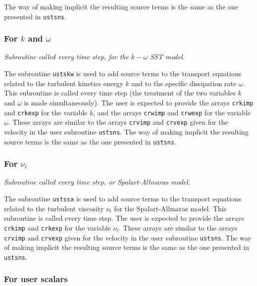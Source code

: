 {{{The way of making implicit the resulting source terms is the same as the
one presented in \texttt{ustsns}.

\subsubsection{For $k$ and $\omega$}

\noindent
\textit{Subroutine called every time step, for the $k-\omega$ SST model.}

The subroutine \texttt{ustskw} is used to add source terms to the transport equations
related to the turbulent kinetics energy $k$ and to the specific
dissipation rate $\omega$. This subroutine is
called every time step (the treatment of the two
variables $k$ and $\omega$ is made simultaneously). The user is expected
to provide the arrays \texttt{crkimp} and \texttt{crkexp} for the variable
$k$, and the arrays \texttt{crwimp} and \texttt{crwexp} for the variable $\omega$.
These arrays are similar to the arrays \texttt{crvimp} and \texttt{crvexp}
given for the velocity in the user subroutine \texttt{ustsns}. The way of
making implicit the resulting source terms is the same as the one presented in
\texttt{ustsns}.

\subsubsection{For $\nu_t$}

\noindent
\textit{Subroutine called every time step, or Spalart-Allmaras model.}

The subroutine \texttt{ustssa} is used to add source terms to the transport equations
related to the turbulent viscosity $\nu_t$ for the Spalart-Allmaras model.
This subroutine is called every time step. The user is expected
to provide the arrays \texttt{crkimp} and \texttt{crkexp} for the variable
$\nu_t$. These arrays are similar to the arrays \texttt{crvimp} and \texttt{crvexp}
given for the velocity in the user subroutine \texttt{ustsns}. The way of
making implicit the resulting source terms is the same as the one presented in
\texttt{ustsns}.

\subsubsection{For user scalars}

}}}
